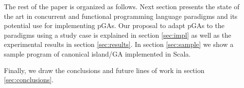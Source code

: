 The rest of the paper is organized as follows. Next section presents the state of the art in concurrent and functional programming language paradigms and its potential use for implementing pGAs. Our proposal to adapt pGAs to the paradigms using a study case is explained in section \ref{sec:impl} as well as the experimental results in section \ref{sec:results}. In section \ref{sec:sample} we show a sample program of canonical island/GA implemented in Scala.

Finally, we draw the conclusions and future lines of work in section \ref{sec:conclusions}.

